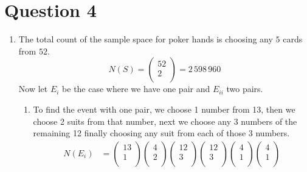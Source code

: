 \documentclass[12pt]{article}
\begin{document}
\section*{Question 4}
\begin{enumerate}[label=\alph*)]
    \item The total count of the sample space for poker hands is choosing any \(5\) cards from \(52\). 
    \[
        N(S) = \begin{pmatrix}
             52 \\
             2 \\
        \end{pmatrix} = 2\,598\,960
    \]
    Now let \(E_i\) be the case where we have one pair and \(E_{ii}\) two pairs.  
    \begin{enumerate}
        \item [i)] To find the event with one pair, we choose 1 number from 13, then we choose 2 suits from that number, next we choose any 3 numbers of the remaining 12
        finally choosing any suit from each of those 3 numbers. 
        \begin{align*}
            N(E_i) &= \begin{pmatrix}
                 13 \\
                1\\
            \end{pmatrix} 
            \begin{pmatrix}
                 4 \\
                 2 \\
            \end{pmatrix}
            \begin{pmatrix}
                12 \\
                 3 \\
            \end{pmatrix}
            \begin{pmatrix}
                 12 \\
                 3 \\
            \end{pmatrix} 
            \begin{pmatrix}
                 4 \\
                 1 \\
            \end{pmatrix}
            \begin{pmatrix}
                4 \\
                1 \\

\end{pmatrix}
\end{align*}
\end{enumerate}
\end{enumerate}
\end{document}
